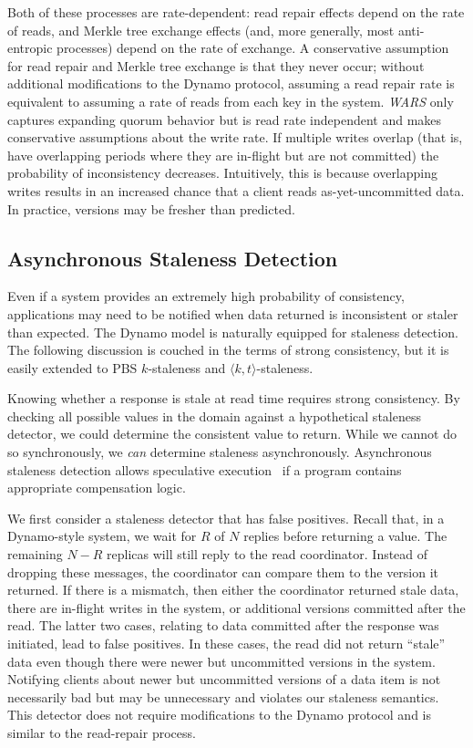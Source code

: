 \documentclass{vldb}
\newcommand{\subsectionskip}{-0em}
\begin{document}
Both of these processes are rate-dependent: read repair effects depend
on the rate of reads, and Merkle tree exchange effects (and, more
generally, most anti-entropic processes) depend on the rate of
exchange.  A conservative assumption for read repair and Merkle tree
exchange is that they never occur; without additional modifications to
the Dynamo protocol, assuming a read repair rate is equivalent to
assuming a rate of reads from each key in the system.  \textit{WARS}
only captures expanding quorum behavior but is read rate independent
and makes conservative assumptions about the write rate.  If multiple
writes overlap (that is, have overlapping periods where they are
in-flight but are not committed) the probability of inconsistency
decreases.  Intuitively, this is because overlapping writes results in
an increased chance that a client reads as-yet-uncommitted data.  In
practice, versions may be fresher than predicted.

\vspace{\subsectionskip}\subsection{Asynchronous Staleness Detection}

Even if a system provides an extremely high probability of
consistency, applications may need to be notified when data returned
is inconsistent or staler than expected.  The Dynamo model is
naturally equipped for staleness detection.  The following discussion
is couched in the terms of strong consistency, but it is easily
extended to PBS $k$-staleness and $\langle k, t \rangle$-staleness.

Knowing whether a response is stale at read time requires strong
consistency.  By checking all possible values in the domain against a
hypothetical staleness detector, we could determine the consistent
value to return.  While we cannot do so synchronously, we \textit{can}
determine staleness asynchronously.  Asynchronous staleness detection
allows speculative execution~\cite{nsdispeculation} if a program
contains appropriate compensation logic.

We first consider a staleness detector that has false positives.
Recall that, in a Dynamo-style system, we wait for $R$ of $N$ replies
before returning a value.  The remaining $N-R$ replicas will still
reply to the read coordinator.  Instead of dropping these messages,
the coordinator can compare them to the version it returned.  If there
is a mismatch, then either the coordinator returned stale data, there
are in-flight writes in the system, or additional versions committed
after the read. The latter two cases, relating to data committed after
the response was initiated, lead to false positives.  In these cases,
the read did not return ``stale'' data even though there were newer
but uncommitted versions in the system.  Notifying clients about newer
but uncommitted versions of a data item is not necessarily bad but may
be unnecessary and violates our staleness semantics.  This detector
does not require modifications to the Dynamo protocol and is similar
to the read-repair process.
\end{document}
